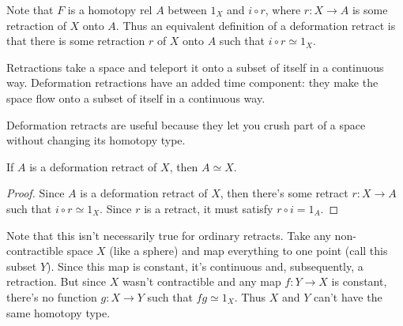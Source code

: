 \documentclass[twoside,10pt]{report}
\begin{document}
Note that $F$ is a homotopy rel $A$ between $1_{X}$ and $i \circ r$, where $r:X\to A$ is some retraction of $X$ onto $A$. Thus an equivalent definition of a deformation retract is that there is some retraction $r$ of $X$ onto $A$ such that $i \circ r \simeq 1_{X}$.

Retractions take a space and teleport it onto a subset of itself in a continuous way. Deformation retractions have an added time component: they make the space flow onto a subset of itself in a continuous way.

Deformation retracts are useful because they let you crush part of a space without changing its homotopy type.

\begin{prop}
	If $A$ is a deformation retract of $X$, then $A \simeq X$.
\end{prop}
\begin{proof}
	Since $A$ is a deformation retract of $X$, then there's some retract $r:X\to A$ such that $i \circ r \simeq 1_{X}$. Since $r$ is a retract, it must satisfy $r \circ i = 1_{A}$.
\end{proof}

Note that this isn't necessarily true for ordinary retracts. Take any non-contractible space $X$ (like a sphere) and map everything to one point (call this subset $Y$). Since this map is constant, it's continuous and, subsequently, a retraction. But since $X$ wasn't contractible and any map $f:Y\to X$ is constant, there's no function $g:X\to Y$ such that $fg \simeq 1_{X}$. Thus $X$ and $Y$ can't have the same homotopy type.
\end{document}
